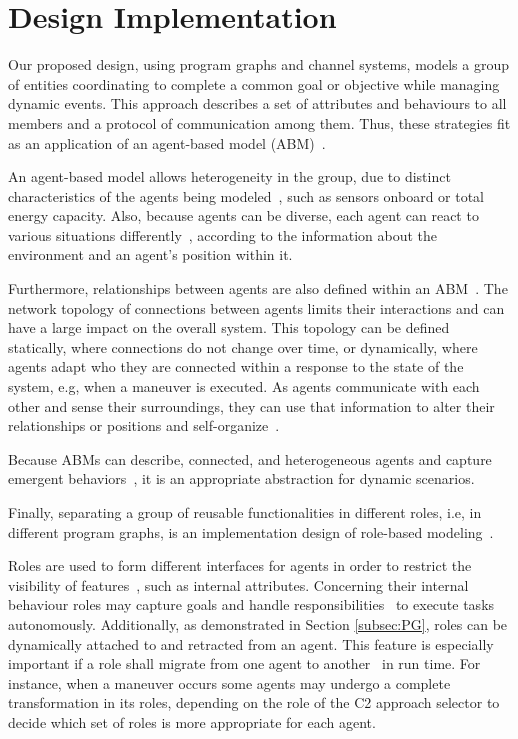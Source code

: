 \section{Design Implementation}
\label{sec:design}

Our proposed design, using program graphs and channel systems, models a group of entities coordinating to complete a common goal or objective while managing dynamic events. This approach describes a set of attributes and behaviours to all members and a protocol of communication among them. Thus, these strategies fit as an application of an agent-based model (ABM)~\cite{evaluating}.

An agent-based model allows heterogeneity in the group, due to distinct characteristics of the agents being modeled~\cite{evaluating}, such as sensors onboard or total energy capacity. Also, because agents can be diverse, each agent can react to various situations differently~\cite{evaluating}, according to the information about the environment and an agent’s position within it.

Furthermore, relationships between agents are also defined within an ABM~\cite{evaluating}. The network topology of connections between agents limits their interactions and can have a large impact on the overall system. This topology can be defined statically, where connections do not change over time, or dynamically, where agents adapt who they are connected within a response to the state of the system, e.g, when a maneuver is executed. As agents communicate with each other and sense their surroundings, they can use that information to alter their relationships or positions and self-organize~\cite{evaluating}.

Because ABMs can describe, connected, and heterogeneous agents and capture emergent behaviors~\cite{evaluating}, it is an appropriate abstraction for dynamic scenarios.


Finally, separating a group of reusable functionalities in different roles, i.e, in different program graphs, is an implementation design of role-based modeling~\cite{roleOrientedModeling, modelingAgentOrganizationsUsingRoles}.

Roles are used to form different interfaces for agents in order to restrict the visibility of features~\cite{roleOrientedModeling}, such as internal attributes. Concerning their internal behaviour roles may capture goals and handle responsibilities~\cite{roleOrientedModeling} to execute tasks autonomously. Additionally, as demonstrated in Section \ref{subsec:PG}, roles can be dynamically attached to and retracted from an agent. This feature is especially important if a role shall migrate from one agent to another~\cite{roleOrientedModeling} in run time. For instance, when a maneuver occurs some agents may undergo a complete transformation in its roles, depending on the role of the C2 approach selector to decide which set of roles is more appropriate for each agent.

